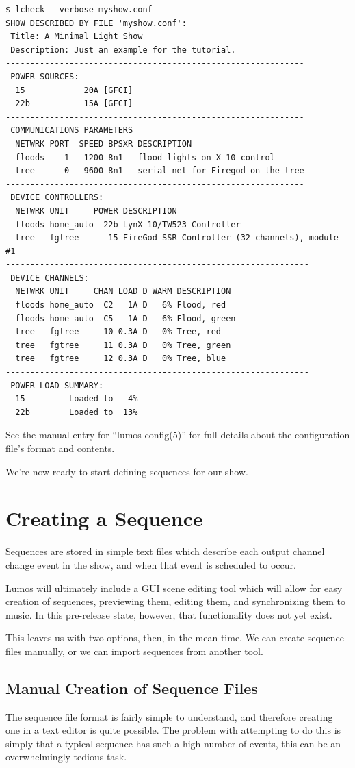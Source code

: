 \documentclass{article}
\begin{document}
\begin{verbatim}
$ lcheck --verbose myshow.conf
SHOW DESCRIBED BY FILE 'myshow.conf':
 Title: A Minimal Light Show
 Description: Just an example for the tutorial.
-------------------------------------------------------------
 POWER SOURCES:
  15            20A [GFCI]
  22b           15A [GFCI]
-------------------------------------------------------------
 COMMUNICATIONS PARAMETERS
  NETWRK PORT  SPEED BPSXR DESCRIPTION
  floods    1   1200 8n1-- flood lights on X-10 control
  tree      0   9600 8n1-- serial net for Firegod on the tree
-------------------------------------------------------------
 DEVICE CONTROLLERS:
  NETWRK UNIT     POWER DESCRIPTION
  floods home_auto  22b LynX-10/TW523 Controller
  tree   fgtree      15 FireGod SSR Controller (32 channels), module #1
--------------------------------------------------------------
 DEVICE CHANNELS:
  NETWRK UNIT     CHAN LOAD D WARM DESCRIPTION
  floods home_auto  C2   1A D   6% Flood, red
  floods home_auto  C5   1A D   6% Flood, green
  tree   fgtree     10 0.3A D   0% Tree, red
  tree   fgtree     11 0.3A D   0% Tree, green
  tree   fgtree     12 0.3A D   0% Tree, blue
--------------------------------------------------------------
 POWER LOAD SUMMARY:
  15         Loaded to   4%
  22b        Loaded to  13%
\end{verbatim}

See the manual entry for ``lumos-config(5)'' for full details about the
configuration file's format and contents.

We're now ready to start defining sequences for our show.

\section{Creating a Sequence}
Sequences are stored in simple text files which describe each output
channel change event in the show, and when that event is scheduled to
occur.  

Lumos will ultimately include a GUI scene editing tool which will allow for
easy creation of sequences, previewing them, editing them, and synchronizing
them to music.  In this pre-release state, however, that functionality does
not yet exist.

This leaves us with two options, then, in the mean time.  We can create 
sequence files manually, or we can import sequences from another tool.

\subsection{Manual Creation of Sequence Files}
The sequence file format is fairly simple to understand, and therefore 
creating one in a text editor is quite possible.  The problem with attempting
to do this is simply that a typical sequence has such a high number of events,
this can be an overwhelmingly tedious task.
\end{document}

